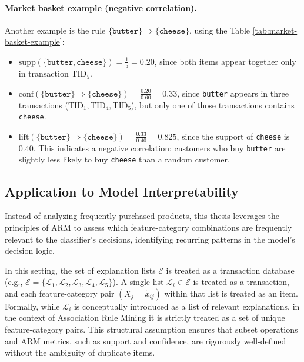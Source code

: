 \paragraph{Market basket example (negative correlation).} Another example is the rule $\{\texttt{butter}\} \Rightarrow \{\texttt{cheese}\}$, using the Table \ref{tab:market-basket-example}:

\begin{itemize}
  \item $\mathrm{supp}(\{\texttt{butter}, \texttt{cheese}\}) = \frac{1}{5} = 0.20$, since both items appear together only in transaction $\text{TID}_5$.
  \item $\mathrm{conf}(\{\texttt{butter}\} \Rightarrow \{\texttt{cheese}\}) = \frac{0.20}{0.60} = 0.33$, since \texttt{butter} appears in three transactions ($\text{TID}_1, \text{TID}_4, \text{TID}_5$), but only one of those transactions contains \texttt{cheese}.
  \item $\mathrm{lift}(\{\texttt{butter}\} \Rightarrow \{\texttt{cheese}\}) = \frac{0.33}{0.40} = 0.825$, since the support of \texttt{cheese} is $0.40$. This indicates a negative correlation: customers who buy \texttt{butter} are slightly less likely to buy \texttt{cheese} than a random customer.
\end{itemize}

\subsection{Application to Model Interpretability}

Instead of analyzing frequently purchased products, this thesis leverages the principles of ARM to assess which feature-category combinations are frequently relevant to the classifier's decisions, identifying recurring patterns in the model's decision logic.

In this setting, the set of explanation lists $\mathcal{E}$ is treated as a transaction database (e.g., $\mathcal{E} = \{\mathcal{L}_1, \mathcal{L}_2, \mathcal{L}_3, \mathcal{L}_4, \mathcal{L}_5\}$). A single list $\mathcal{L}_i \in \mathcal{E}$ is treated as a transaction, and each feature-category pair $(X_j = \tilde{x}_{ij})$ within that list is treated as an item. Formally, while $\mathcal{L}_i$ is conceptually introduced as a list of relevant explanations, in the context of Association Rule Mining it is strictly treated as a set of unique feature-category pairs. This structural assumption ensures that subset operations and ARM metrics, such as support and confidence, are rigorously well-defined without the ambiguity of duplicate items.

